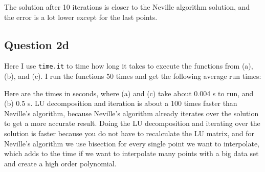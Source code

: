 The solution after 10 iterations is closer to the Neville algorithm solution, 
and the error is a lot lower except for the last points.

\subsection{Question 2d}

Here I use \texttt{time.it} to time how long it takes to execute the functions from (a), (b), and (c).
I run the functions 50 times and get the following average run times:



Here are the times in seconds, where (a) and (c) take about 0.004 s to run, and (b) 0.5 s.
LU decomposition and iteration is about a 100 times faster than Neville's algorithm, 
because Neville's algorithm already iterates over the solution to get a more accurate result. 
Doing the LU decomposition and iterating over the solution is faster because you do not have to 
recalculate the LU matrix, and for Neville's algorithm we use bisection for every single point 
we want to interpolate, which adds to the time if we want to interpolate many points with a 
big data set and create a high order polynomial.


